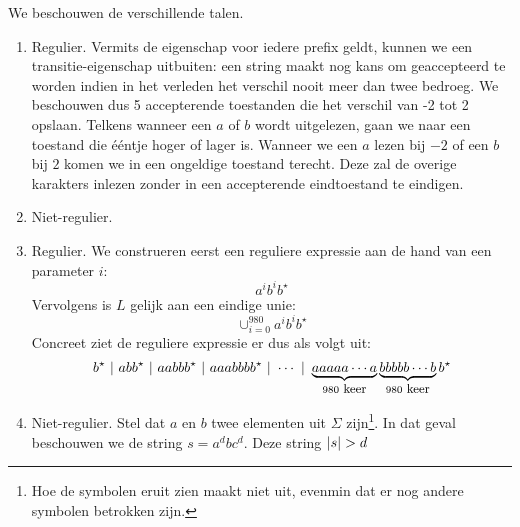 \documentclass{article}
\begin{document}
\begin{answer}
We beschouwen de verschillende talen.
\begin{enumerate}
 \item Regulier. Vermits de eigenschap voor iedere prefix geldt, kunnen we een transitie-eigenschap uitbuiten: een string maakt nog kans om geaccepteerd te worden indien in het verleden het verschil nooit meer dan twee bedroeg. We beschouwen dus 5 accepterende toestanden die het verschil van -2 tot 2 opslaan. Telkens wanneer een $a$ of $b$ wordt uitgelezen, gaan we naar een toestand die \'e\'entje hoger of lager is. Wanneer we een $a$ lezen bij $-2$ of een $b$ bij $2$ komen we in een ongeldige toestand terecht. Deze zal de overige karakters inlezen zonder in een accepterende eindtoestand te eindigen.\\
 \begin{center}
 \end{center}
 \item Niet-regulier.
 \item Regulier. We construeren eerst een reguliere expressie aan de hand van een parameter $i$:
 \begin{equation}
  a^ib^ib^\star
 \end{equation}
 Vervolgens is $L$ gelijk aan een eindige unie:
 \begin{equation}
  \cup_{i=0}^980 a^ib^ib^\star
 \end{equation}
Concreet ziet de reguliere expressie er dus als volgt uit:
\begin{equation}
 b^\star\ |\ abb^\star\ |\ aabbb^\star\ |\ aaabbbb^\star\ |\ \cdots\ |\ \underbrace{aaaaa\cdots a}_{980\mbox{\small{ keer}}}\underbrace{bbbbb\cdots b}_{980\mbox{\small{ keer}}}b^\star
\end{equation}

 \item Niet-regulier. Stel dat $a$ en $b$ twee elementen uit $\Sigma$ zijn\footnote{Hoe de symbolen eruit zien maakt niet uit, evenmin dat er nog andere symbolen betrokken zijn.}. In dat geval beschouwen we de string $s=a^dbc^d$. Deze string $\abs{s}>d$
\end{enumerate}
\end{answer}
\end{document}
